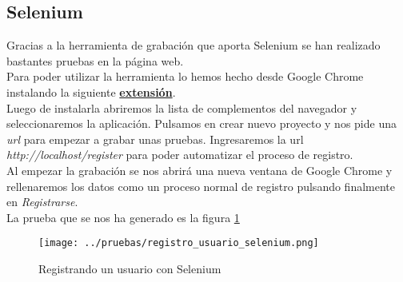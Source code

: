 \subsection{Selenium}
Gracias a la herramienta de grabación que aporta Selenium se han realizado bastantes pruebas en la página web.
\\Para poder utilizar la herramienta lo hemos hecho desde Google Chrome instalando la siguiente \href{https://chrome.google.com/webstore/detail/selenium-ide/mooikfkahbdckldjjndioackbalphokd}{\textbf{extensión}}.
\\Luego de instalarla abriremos la lista de complementos del navegador y seleccionaremos la aplicación. Pulsamos en crear nuevo proyecto y nos pide una \textit{url} para empezar a grabar unas pruebas. Ingresaremos la url \textit{http://localhost/register} para poder automatizar el proceso de registro.
\\Al empezar la grabación se nos abrirá una nueva ventana de Google Chrome y rellenaremos los datos como un proceso normal de registro pulsando finalmente en \textit{Registrarse}.
\\La prueba que se nos ha generado es la figura \ref{fig:registro-usuario-selenium}
\begin{figure}[h]
    \centering
    \texttt{[image: ../pruebas/registro\_usuario\_selenium.png]}
    \caption{Registrando un usuario con Selenium}\label{fig:registro-usuario-selenium}
\end{figure}

